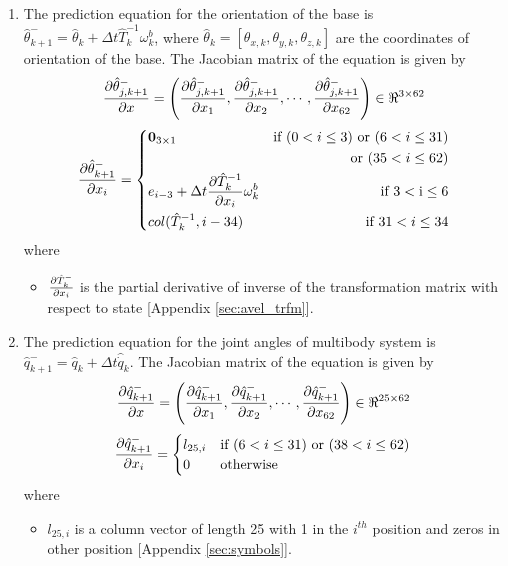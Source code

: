 \begin{enumerate}
\item The prediction equation for the orientation of the base is $\hat{\theta}_{k+1}^- = \hat{\theta}_k + \Delta t \hat T_k^{-1} \omega_k^b$, where $\hat \theta_k = [ \theta_{x,k},\theta_{y,k},\theta_{z,k}]$ are the coordinates of orientation of the base. The Jacobian matrix of the equation is given by
\begin{equation}
\label{eq:dthetadx}
\frac{\partial {\hat{\theta}_{j,k+1}^-}}{\partial {x}} = \left(\frac{\partial {\hat{\theta}_{j,k+1}^-}}{\partial {x_{1}}}, \frac{\partial {\hat{\theta}_{j,k+1}^-}}{\partial {x_{2}}}, \cdots , \frac{\partial {\hat{\theta}_{j,k+1}^-}}{\partial {x_{62}}}\right) \in \Re^{3 \times 62}
\end{equation}
\[
 \frac{\partial {\hat{\theta}_{k+1}^-}}{\partial {x_{i}}} = \left\lbrace
  \!\begin{aligned}
   &\textbf{0}_{3 \times 1} &\text{if }(0 < i \leq 3) \text{ or }(6 < i \leq 31) \\
   &\hspace{2cm} &\text{ or } (35 < i \leq 62) \\
   &e_{i-3} + \Delta t \frac{\partial {\hat T_k^{-1}}}{\partial {x_i}}\omega_k^b & \text{if }3< \text{i} \leq 6 \\
   &col(\hat T_k^{-1},i-34) & \text{if } 31 < i \leq 34 \\
  \end{aligned} \right. 
\]where
\begin{itemize}
\item $\frac{\partial {\hat T_k^-}}{\partial {x_i}}$ is the partial derivative of inverse of the transformation matrix with respect to state [Appendix \ref{sec:avel_trfm}].
\end{itemize}

\item The prediction equation for the joint angles of multibody system is  $\hat{q}_{k+1}^- = \hat{q}_k + \Delta t \hat {\dot{q}}_k $. The Jacobian matrix of the equation is given by
\begin{equation}
\label{eq:dqdx}
\frac{\partial {\hat{q}_{k+1}^-}}{\partial {x}} = \left(\frac{\partial {\hat{q}_{k+1}^-}}{\partial {x_{1}}}, \frac{\partial {\hat{q}_{k+1}^-}}{\partial {x_{2}}}, \cdots , \frac{\partial {\hat{q}_{k+1}^-}}{\partial {x_{62}}}\right) \in \Re^{25 \times 62}
\end{equation}
\[
\frac{\partial {\hat{q}_{k+1}^-}}{\partial {x_{i}}} = 
	\begin{cases}
	l_{25,i} & \text{if } (6 < i \leq 31) \text{ or } (38 < i \leq 62) \\
	0 & \text{otherwise}   \\
	\end{cases}
\]where
\begin{itemize}
\item $l_{25,i}$ is a column vector of length 25 with 1 in the $i^{th}$ position and zeros in other position [Appendix \ref{sec:symbols}].
\end{itemize}


\end{enumerate}
